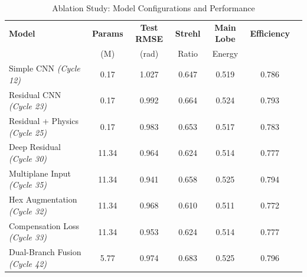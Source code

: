 \begin{table}[htbp]
\centering
\caption{Ablation Study: Model Configurations and Performance}
\label{tab:ablation}
\begin{tabular}{lcccccc}
\toprule
\textbf{Model} & \textbf{Params} & \textbf{Test RMSE} & \textbf{Strehl} & \textbf{Main Lobe} & \textbf{Efficiency} \\
 & (M) & (rad) & Ratio & Energy & \\
\midrule
Simple CNN \textit{(Cycle 12)} & 0.17 & 1.027 & 0.647 & 0.519 & 0.786 \\
Residual CNN \textit{(Cycle 23)} & 0.17 & 0.992 & 0.664 & 0.524 & 0.793 \\
Residual + Physics \textit{(Cycle 25)} & 0.17 & 0.983 & 0.653 & 0.517 & 0.783 \\
Deep Residual \textit{(Cycle 30)} & 11.34 & 0.964 & 0.624 & 0.514 & 0.777 \\
Multiplane Input \textit{(Cycle 35)} & 11.34 & 0.941 & 0.658 & 0.525 & 0.794 \\
Hex Augmentation \textit{(Cycle 32)} & 11.34 & 0.968 & 0.610 & 0.511 & 0.772 \\
Compensation Loss \textit{(Cycle 33)} & 11.34 & 0.953 & 0.624 & 0.514 & 0.777 \\
Dual-Branch Fusion \textit{(Cycle 42)} & 5.77 & 0.974 & 0.683 & 0.525 & 0.796 \\
\bottomrule
\end{tabular}
\end{table}
